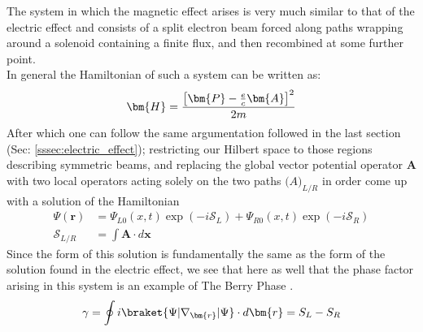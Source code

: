 \documentclass{article}
\begin{document}
The system in which the magnetic effect arises is very much similar to that of the electric effect and consists of a split electron beam forced along paths wrapping around a solenoid containing a finite flux, and then recombined at some further point.\\

In general the Hamiltonian of such a system can be written as:
\begin{equation*}
  \bm{H} = \frac{\left[ \bm{P} - \frac{e}{c}\bm{A} \right]^{2}}{2m} \\
\end{equation*}
After which one can follow the same argumentation followed in the last section (Sec: \ref{sssec:electric_effect}); restricting our Hilbert space to those regions describing symmetric beams, and replacing the global vector potential operator $\bm{A}$ with two local operators acting solely on the two paths $\bm(A)_{L/R}$ in order come up with a solution of the Hamiltonian
\begin{align*}
  \Psi(\bm{r})&=\Psi_{L0}(x,t)\exp(-i \mathcal{S}_{L}) + \Psi_{R0}(x,t)\exp(-i \mathcal{S}_{R})\\
  \mathcal{S}_{L/R} &= \int \bm{A} \cdot d\bm{x} 
\end{align*}
Since the form of this solution is fundamentally the same as the form of the solution found in the electric effect, we see that here as well that the phase factor arising in this system is an example of The Berry Phase \cite{Aharonov1959}.
  \begin{equation*}
    \gamma = \oint i\braket{\Psi|\nabla_{\bm{r}}|\Psi} \cdot d\bm{r} = S_{L} - S_{R}
  \end{equation*}



\end{document}
